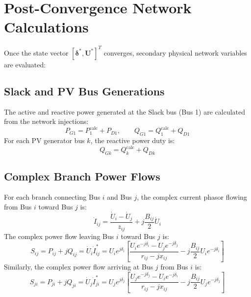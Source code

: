 \documentclass[12pt,a4paper,oneside]{report}
\begin{document}
\section{Post-Convergence Network Calculations}
Once the state vector $[\boldsymbol{\delta}^*, \mathbf{U}^*]^T$ converges, secondary physical network variables are evaluated:

\subsection{Slack and PV Bus Generations}
The active and reactive power generated at the Slack bus (Bus 1) are calculated from the network injections:
\begin{equation}
P_{G1} = P_1^{\text{calc}} + P_{D1}, \qquad Q_{G1} = Q_1^{\text{calc}} + Q_{D1}
\end{equation}
For each PV generator bus $k$, the reactive power duty is:
\begin{equation}
Q_{Gk} = Q_k^{\text{calc}} + Q_{Dk}
\end{equation}

\subsection{Complex Branch Power Flows}
For each branch connecting Bus $i$ and Bus $j$, the complex current phasor flowing from Bus $i$ toward Bus $j$ is:
\begin{equation}
\dot{I}_{ij} = \frac{\dot{U}_i - \dot{U}_j}{z_{ij}} + j \frac{B_{ij}}{2} \dot{U}_i
\end{equation}
The complex power flow leaving Bus $i$ toward Bus $j$ is:
\begin{equation}
S_{ij} = P_{ij} + jQ_{ij} = \dot{U}_i \dot{I}_{ij}^* = U_i e^{j\delta_i} \left[ \frac{U_i e^{-j\delta_i} - U_j e^{-j\delta_j}}{r_{ij} - jx_{ij}} - j \frac{B_{ij}}{2} U_i e^{-j\delta_i} \right]
\end{equation}
Similarly, the complex power flow arriving at Bus $j$ from Bus $i$ is:
\begin{equation}
S_{ji} = P_{ji} + jQ_{ji} = \dot{U}_j \dot{I}_{ji}^* = U_j e^{j\delta_j} \left[ \frac{U_j e^{-j\delta_j} - U_i e^{-j\delta_i}}{r_{ij} - jx_{ij}} - j \frac{B_{ij}}{2} U_j e^{-j\delta_j} \right]
\end{equation}
\end{document}
